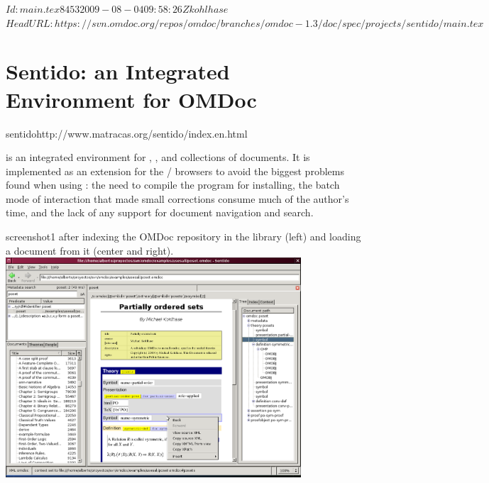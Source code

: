 \svnInfo $Id: main.tex 8453 2009-08-04 09:58:26Z kohlhase $
\svnKeyword $HeadURL: https://svn.omdoc.org/repos/omdoc/branches/omdoc-1.3/doc/spec/projects/sentido/main.tex $

\section[Sentido Integrated Environment]{Sentido: an Integrated Environment for OMDoc}
\begin{project}{sentido}{http://www.matracas.org/sentido/index.en.html}
\end{project}

{\sentido} is an integrated environment for {}, {},
and {} collections of {\omdoc} documents.
It is implemented as an extension for the {\mozilla}/{\firefox} browsers
to avoid the biggest problems found when using {\qmath}:
the need to compile the program for installing, the batch mode of interaction
that made small corrections consume much of the author's time,
and the lack of any support for document navigation and search.

\begin{myfig}{screenshot1}{{\sentido} after indexing the OMDoc repository in the library (left) and
    loading a document from it (center and right).}
  \includegraphics[width=11cm]{projects/sentido/sentido_general_poset}
\end{myfig}


